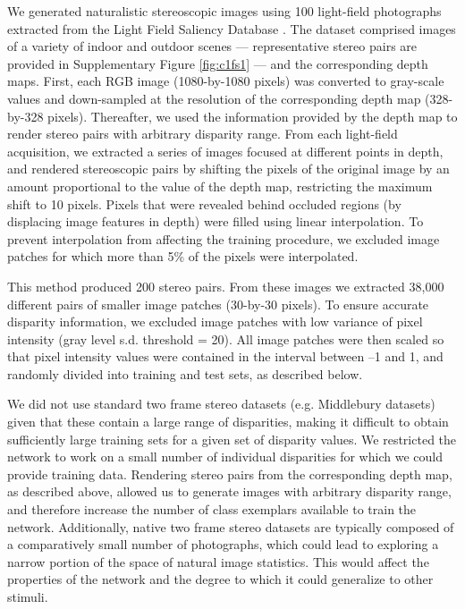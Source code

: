 We generated naturalistic stereoscopic images using 100 light-field photographs extracted from the Light Field Saliency Database \cite{Li:2014ik}. The dataset comprised images of a variety of indoor and outdoor scenes --- representative stereo pairs are provided in Supplementary Figure \ref{fig:c1fs1} --- and the corresponding depth maps. First, each RGB image (1080-by-1080 pixels) was converted to gray-scale values and down-sampled at the resolution of the corresponding depth map (328-by-328 pixels). Thereafter, we used the information provided by the depth map to render stereo pairs with arbitrary disparity range. From each light-field acquisition, we extracted a series of images focused at different points in depth, and rendered stereoscopic pairs by shifting the pixels of the original image by an amount proportional to the value of the depth map, restricting the maximum shift to 10 pixels. Pixels that were revealed behind occluded regions (by displacing image features in depth) were filled using linear interpolation. To prevent interpolation from affecting the training procedure, we excluded image patches for which more than 5\% of the pixels were interpolated. 

This method produced 200 stereo pairs. From these images we extracted 38,000 different pairs of smaller image patches (30-by-30 pixels). To ensure accurate disparity information, we excluded image patches with low variance of pixel intensity (gray level s.d. threshold = 20). All image patches were then scaled so that pixel intensity values were contained in the interval between --1 and 1, and randomly divided into training and test sets, as described below. 

We did not use standard two frame stereo datasets (e.g. Middlebury datasets) given that these contain a large range of disparities, making it difficult to obtain sufficiently large training sets for a given set of disparity values. We restricted the network to work on a small number of individual disparities for which we could provide training data. Rendering stereo pairs from the corresponding depth map, as described above, allowed us to generate images with arbitrary disparity range, and therefore increase the number of class exemplars available to train the network. Additionally, native two frame stereo datasets are typically composed of a comparatively small number of photographs, which could lead to exploring a narrow portion of the space of natural image statistics. This would affect the properties of the network and the degree to which it could generalize to other stimuli. 

